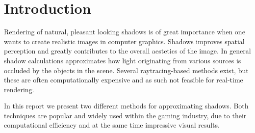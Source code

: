 \section{Introduction}

Rendering of natural, pleasant looking shadows is of great importance
when one wants to create realistic images in computer
graphics. Shadows improves spatial perception and greatly contributes
to the overall aestetics of the image. In general shadow calculations
approximates how light originating from various sources is occluded by
the objects in the scene. Several raytracing-based methods exist,
but these are often computationally expensive and as such not feasible
for real-time rendering. 

In this report we present two different methods for approximating
shadows. Both techniques are popular and widely used within the gaming
industry, due to their computational efficiency and at the same time
impressive visual results.

